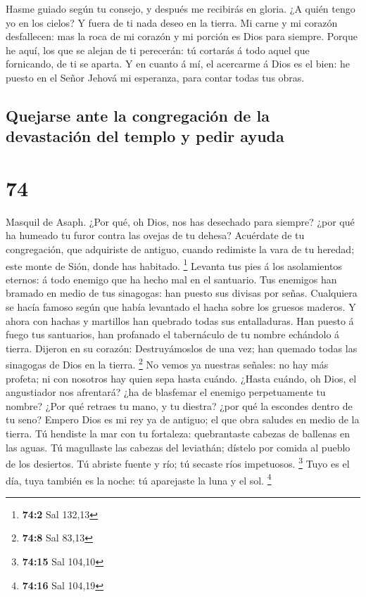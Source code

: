  Hasme guiado según tu consejo, y después me recibirás en
gloria.  ¿A quién tengo yo en los cielos? Y fuera de ti
nada deseo en la tierra.  Mi carne y mi corazón
desfallecen: mas la roca de mi corazón y mi porción es Dios para
siempre.  Porque he aquí, los que se alejan de ti
perecerán: tú cortarás á todo aquel que fornicando, de ti se aparta.
 Y en cuanto á mí, el acercarme á Dios es el bien: he
puesto en el Señor Jehová mi esperanza, para contar todas tus obras.

\hypertarget{quejarse-ante-la-congregaciuxf3n-de-la-devastaciuxf3n-del-templo-y-pedir-ayuda}{%
\subsection{Quejarse ante la congregación de la devastación del templo y
pedir
ayuda}\label{quejarse-ante-la-congregaciuxf3n-de-la-devastaciuxf3n-del-templo-y-pedir-ayuda}}

\hypertarget{section-73}{%
\section{74}\label{section-73}}

 Masquil de Asaph. ¿Por qué, oh Dios, nos has desechado para
siempre? ¿por qué ha humeado tu furor contra las ovejas de tu dehesa?
 Acuérdate de tu congregación, que adquiriste de antiguo,
cuando redimiste la vara de tu heredad; este monte de Sión, donde has
habitado. \footnote{\textbf{74:2} Sal 132,13}  Levanta tus
pies á los asolamientos eternos: á todo enemigo que ha hecho mal en el
santuario.  Tus enemigos han bramado en medio de tus
sinagogas: han puesto sus divisas por señas.  Cualquiera se
hacía famoso según que había levantado el hacha sobre los gruesos
maderos.  Y ahora con hachas y martillos han quebrado todas
sus entalladuras.  Han puesto á fuego tus santuarios, han
profanado el tabernáculo de tu nombre echándolo á tierra. 
Dijeron en su corazón: Destruyámoslos de una vez; han quemado todas las
sinagogas de Dios en la tierra. \footnote{\textbf{74:8} Sal 83,13}
 No vemos ya nuestras señales: no hay más profeta; ni con
nosotros hay quien sepa hasta cuándo.  ¿Hasta cuándo, oh
Dios, el angustiador nos afrentará? ¿ha de blasfemar el enemigo
perpetuamente tu nombre?  ¿Por qué retraes tu mano, y tu
diestra? ¿por qué la escondes dentro de tu seno?  Empero
Dios es mi rey ya de antiguo; el que obra saludes en medio de la tierra.
 Tú hendiste la mar con tu fortaleza: quebrantaste cabezas
de ballenas en las aguas.  Tú magullaste las cabezas del
leviathán; dístelo por comida al pueblo de los desiertos. 
Tú abriste fuente y río; tú secaste ríos impetuosos. \footnote{\textbf{74:15}
  Sal 104,10}  Tuyo es el día, tuya también es la noche: tú
aparejaste la luna y el sol. \footnote{\textbf{74:16} Sal 104,19}

